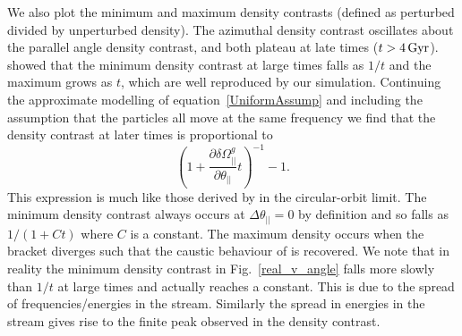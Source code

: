 \documentclass[useAMS,usenatbib,fleqn,a4paper]{mn2e}
\def\Gyr{\,{\rm Gyr}}
\begin{document}
We also plot the minimum and maximum density contrasts (defined as perturbed divided by unperturbed density). The azimuthal density contrast oscillates about the parallel angle density contrast, and both plateau at late times ($t>4\Gyr$). \cite{ErkalBelokurov2015} showed that the minimum density contrast at large times falls as $1/t$ and the maximum grows as $t$, which are well reproduced by our simulation. Continuing the approximate modelling of equation~\eqref{UniformAssump} and including the assumption that the particles all move at the same frequency we find that the density contrast at later times is proportional to
\begin{equation}
(1+\frac{\partial\delta\Omega^g_{||}}{\partial\theta_{||}}t)^{-1}-1.
\label{densitycontrast}
\end{equation}
This expression is much like those derived by \cite{ErkalBelokurov2015} in the circular-orbit limit. The minimum density contrast always occurs at $\Delta\theta_{||}=0$ by definition and so falls as $1/(1+Ct)$ where $C$ is a constant. The maximum density occurs when the bracket diverges such that the caustic behaviour of \cite{ErkalBelokurov2015} is recovered. We note that in reality the minimum density contrast in Fig.~\ref{real_v_angle} falls more slowly than $1/t$ at large times and actually reaches a constant. This is due to the spread of frequencies/energies in the stream. Similarly the spread in energies in the stream gives rise to the finite peak observed in the density contrast.
\end{document}
